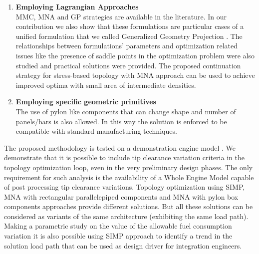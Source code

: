 \begin{enumerate}
	\item \textbf{Employing Lagrangian Approaches}\\
	MMC, MNA and GP strategies are available in the literature.  In our contribution we also show that these formulations are particular cases of a unified formulation that we called Generalized Geometry Projection \cite{coniglio2019generalized}. The relationships between formulations' parameters and optimization related issues like the presence of saddle points in the optimization problem were also studied and practical solutions were provided. The proposed continuation strategy for stress-based topology with MNA approach can be used to achieve improved optima with small area of intermediate densities. 
	\item \textbf{Employing specific geometric primitives}\\
	The use of pylon like components that can change shape and number of panels/bars is also allowed. In this way the solution is enforced to be compatible with standard manufacturing techniques. 
\end{enumerate}
The proposed methodology is tested on a demonstration engine model \cite{coniglio2019enginepylon}.
We demonstrate that it is possible to include tip clearance variation criteria in the topology optimization loop, even in the very preliminary design phases. The only requirement for such analysis is the availability of a Whole Engine Model capable of post processing tip clearance variations.
Topology optimization using SIMP, MNA with rectangular parallelepiped components and MNA with pylon box components approaches provide different solutions. But all these solutions can be considered as variants of the same architecture (exhibiting the same load path). Making a parametric study on the value of the allowable fuel consumption variation it is also possible using SIMP approach to identify a trend in the solution load path that can be used as design driver for integration engineers. 
